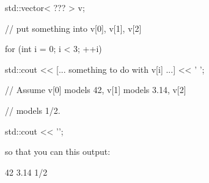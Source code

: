 
\begin{console}

std::vector< ??? > v;

// put something into v[0], v[1], v[2]

for (int i = 0; i < 3; ++i)

{   

    std::cout << [... something to do with v[i] ...] << '{} ';

}

// Assume v[0] models 42, v[1] models 3.14, v[2]

// models 1/2.

std::cout << '\n';

\end{console}



so that you can this output:



\begin{console}

42 3.14 1/2

\end{console}


